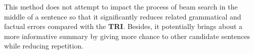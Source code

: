 This method does not attempt to impact the process of beam search in the middle of a sentence so that it significantly reduces related grammatical and factual errors compared with the \textbf{TRI}.
Besides, it potentially brings about a more informative summary by 
giving more chance to other candidate sentences while reducing repetition.
